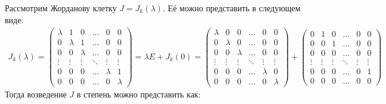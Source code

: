 \begin{algorithm}
    Рассмотрим Жорданову клетку $J = J_k(\lambda)$. Её можно представить в следующем виде:
    \begin{eqnarray*}
        J_k(\lambda) = \begin{pmatrix}
            \lambda & 1       & 0       & \dots  & 0       & 0          \\
            0       & \lambda & 1       & \dots  & 0       & 0          \\
            0       & 0       & \lambda & \dots  & 0       & 0          \\
            \vdots  & \vdots  & \vdots  & \ddots & \vdots  & \vdots     \\
            0       & 0       & 0       & \dots  & \lambda & 1          \\
            0       & 0       & 0       & \dots  & 0       & \lambda
        \end{pmatrix} = \lambda E + J_k(0) = \begin{pmatrix}
            \lambda & 0       & 0       & \dots  & 0       & 0          \\
            0       & \lambda & 0       & \dots  & 0       & 0          \\
            0       & 0       & \lambda & \dots  & 0       & 0          \\
            \vdots  & \vdots  & \vdots  & \ddots & \vdots  & \vdots     \\
            0       & 0       & 0       & \dots  & \lambda & 0          \\
            0       & 0       & 0       & \dots  & 0       & \lambda
        \end{pmatrix} + \begin{pmatrix}
            0       & 1       & 0       & \dots  & 0       & 0          \\
            0       & 0       & 1       & \dots  & 0       & 0          \\
            0       & 0       & 0       & \dots  & 0       & 0          \\
            \vdots  & \vdots  & \vdots  & \ddots & \vdots  & \vdots     \\
            0       & 0       & 0       & \dots  & 0       & 1          \\
            0       & 0       & 0       & \dots  & 0       & 0
        \end{pmatrix}
    \end{eqnarray*}
    Тогда возведение $J$ в степень можно представить как: 

\end{algorithm}
